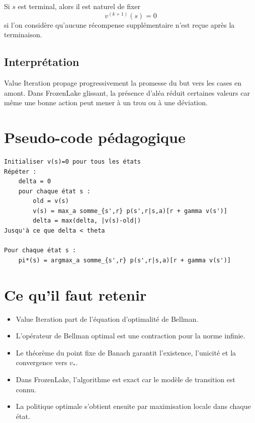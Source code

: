 \documentclass[11pt,a4paper]{article}
\begin{document}
Si $s$ est terminal, alors il est naturel de fixer
\[
v^{(k+1)}(s)=0
\]
si l'on considère qu'aucune récompense supplémentaire n'est reçue après la terminaison.

\subsection{Interprétation}

Value Iteration propage progressivement la promesse du but vers les cases en amont. Dans FrozenLake glissant, la présence d'aléa réduit certaines valeurs car même une bonne action peut mener à un trou ou à une déviation.

\section{Pseudo-code pédagogique}

\begin{verbatim}
Initialiser v(s)=0 pour tous les états
Répéter :
    delta = 0
    pour chaque état s :
        old = v(s)
        v(s) = max_a somme_{s',r} p(s',r|s,a)[r + gamma v(s')]
        delta = max(delta, |v(s)-old|)
Jusqu'à ce que delta < theta

Pour chaque état s :
    pi*(s) = argmax_a somme_{s',r} p(s',r|s,a)[r + gamma v(s')]
\end{verbatim}

\section{Ce qu'il faut retenir}

\begin{itemize}[leftmargin=1.6em]
    \item Value Iteration part de l'équation d'optimalité de Bellman.
    \item L'opérateur de Bellman optimal est une contraction pour la norme infinie.
    \item Le théorème du point fixe de Banach garantit l'existence, l'unicité et la convergence vers $v_*$.
    \item Dans FrozenLake, l'algorithme est exact car le modèle de transition est connu.
    \item La politique optimale s'obtient ensuite par maximisation locale dans chaque état.
\end{itemize}
\end{document}
